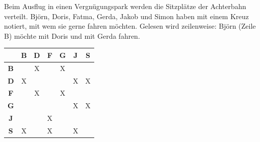 \documentclass[11pt,a4paper]{article}
\begin{document}

\begin{minipage}[t]{0.6\linewidth}
\vspace{0pt}\raggedright
Beim Ausflug in einen Vergnügungspark werden die Sitzplätze der Achterbahn verteilt. Björn, Doris, Fatma, Gerda, Jakob und Simon haben mit einem Kreuz notiert, mit wem sie gerne fahren möchten. Gelesen wird zeilenweise: Björn (Zeile B) möchte mit Doris und mit Gerda fahren.
\end{minipage}\hfill
\begin{minipage}[t]{0.36\linewidth}
\vspace{0pt}\centering\small
\renewcommand{\arraystretch}{1.1}
\begin{tabular}{|c|c|c|c|c|c|c|}\hline
 & \textbf{B} & \textbf{D} & \textbf{F} & \textbf{G} & \textbf{J} & \textbf{S}\\\hline
\textbf{B} &   & X &   & X &   &  \\\hline
\textbf{D} & X &   &   &   & X & X\\\hline
\textbf{F} &   & X &   & X &   &  \\\hline
\textbf{G} &   &   &   &   & X & X\\\hline
\textbf{J} &   &   & X &   &   &  \\\hline
\textbf{S} & X &   & X &   & X &  \\\hline
\end{tabular}
\end{minipage}
\end{document}
